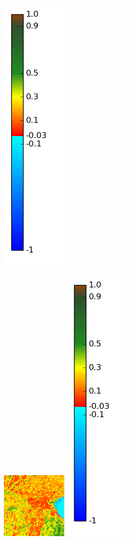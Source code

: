 \documentclass{book}
\begin{document}
\begin{figure}[H]
{\includegraphics[scale=0.2]{images/colormap.png}
}
\centerline{
\includegraphics[scale=0.7]{images/Annecy/08_ndvi.png}
\includegraphics[scale=0.2]{images/colormap.png}
}
\end{figure}
\end{document}
